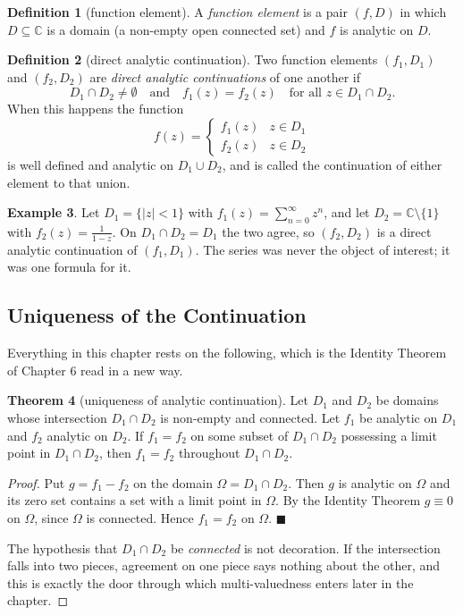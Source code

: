 \documentclass[11pt,a4paper]{article}
\theoremstyle{definition}
\newtheorem{thm}{Theorem}[section]
\newtheorem{definition}[thm]{Definition}
\newtheorem{example}[thm]{Example}
\begin{document}
\begin{definition}[function element]
A \emph{function element} is a pair $(f, D)$ in which $D \subseteq \mathbb{C}$ is
a domain (a non-empty open connected set) and $f$ is analytic on $D$.
\end{definition}

\begin{definition}[direct analytic continuation]
Two function elements $(f_1, D_1)$ and $(f_2, D_2)$ are \emph{direct analytic
continuations} of one another if
$$D_1 \cap D_2 \neq \emptyset \quad \text{and}\quad 
f_1(z) = f_2(z) \quad \text{for all } z \in D_1 \cap D_2 .$$
When this happens the function
$$f(z) = \begin{cases} f_1(z) & z \in D_1\\ f_2(z) & z \in D_2\end{cases}$$
is well defined and analytic on $D_1 \cup D_2$, and is called the continuation of
either element to that union.
\end{definition}

\begin{example}
Let $D_1 = \{\left|z\right| < 1\}$ with $f_1(z) = \sum^{\infty}_{n=0} z^n$, and
let $D_2 = \mathbb{C} \setminus \{1\}$ with $f_2(z) = \frac{1}{1 - z}$. On
$D_1 \cap D_2 = D_1$ the two agree, so $(f_2, D_2)$ is a direct analytic
continuation of $(f_1, D_1)$. The series was never the object of interest; it was
one formula for it.
\end{example}

{\color[wave]{485}\subsection{Uniqueness of the Continuation}}

Everything in this chapter rests on the following, which is the Identity Theorem
of Chapter 6 read in a new way.

\begin{thm}[uniqueness of analytic continuation]
Let $D_1$ and $D_2$ be domains whose intersection $D_1 \cap D_2$ is non-empty and
connected. Let $f_1$ be analytic on $D_1$ and $f_2$ analytic on $D_2$. If
$f_1 = f_2$ on some subset of $D_1 \cap D_2$ possessing a limit point in
$D_1 \cap D_2$, then $f_1 = f_2$ throughout $D_1 \cap D_2$.
\end{thm}

\begin{proof}
Put $g = f_1 - f_2$ on the domain $\Omega = D_1 \cap D_2$. Then $g$ is analytic
on $\Omega$ and its zero set contains a set with a limit point in $\Omega$. By
the Identity Theorem $g \equiv 0$ on $\Omega$, since $\Omega$ is connected. Hence
$f_1 = f_2$ on $\Omega$. $\blacksquare$

The hypothesis that $D_1\cap D_2$ be \emph{connected} is not decoration. If the
intersection falls into two pieces, agreement on one piece says nothing about the
other, and this is exactly the door through which multi-valuedness enters later
in the chapter.
\end{proof}
\end{document}
